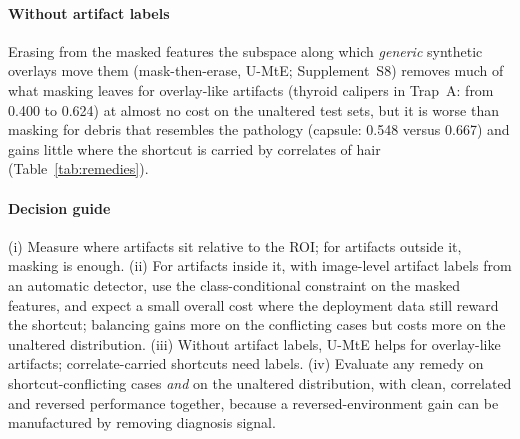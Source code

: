 \paragraph{Without artifact labels} Erasing from the masked features the subspace along which \emph{generic}
synthetic overlays move them (mask-then-erase, U-MtE; Supplement~S8) removes much of what masking leaves for
overlay-like artifacts (thyroid calipers in Trap~A: from 0.400 to 0.624) at almost no cost on the unaltered test sets,
but it is worse than masking for debris that resembles the pathology (capsule: 0.548 versus 0.667) and gains little where
the shortcut is carried by correlates of hair (Table~\ref{tab:remedies}).

\paragraph{Decision guide} (i) Measure where artifacts sit relative to the ROI; for artifacts outside it, masking is
enough. (ii) For artifacts inside it, with image-level artifact labels from an automatic detector, use the
class-conditional constraint on the masked features, and expect a small overall cost where the deployment data still
reward the shortcut; balancing gains more on the conflicting cases but costs more on the unaltered distribution. (iii) Without artifact labels, U-MtE helps for overlay-like artifacts; correlate-carried shortcuts
need labels. (iv) Evaluate any remedy on shortcut-conflicting cases \emph{and} on the unaltered distribution, with clean,
correlated and reversed performance together, because a reversed-environment gain can be manufactured by removing
diagnosis signal.
